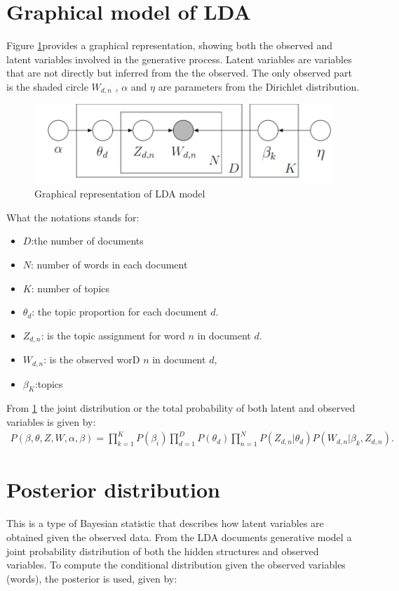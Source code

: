 \section{Graphical model of LDA}
Figure \ref{Figure 2.3}provides a graphical representation, showing both the observed and latent variables involved in the generative process. Latent variables are variables that are not directly but inferred from the the observed.
The only observed part is the shaded circle $W_{d,n}$ , $\alpha$ and $\eta$ are parameters from the Dirichlet distribution.
\begin{figure}[hbtp]
\centering
\includegraphics[scale=0.5]{Graphical.png}
\caption{Graphical representation of LDA model} \label{Figure 2.3}
\end{figure}
What the notations stands for:
\begin{itemize}
\item$D$:the number of documents
\item$N$: number of words in each document
\item$K$: number of topics
\item$\theta_d$: the topic proportion for each document $d$.
\item $Z_{d,n}$: is the topic assignment for word $n$ in document $d$.
\item $W_{d,n}$: is the observed worD $n$ in document $d$,
\item $\beta_K$:topics
\end{itemize}
From \ref{Figure 2.3} the joint  distribution or the total probability of both latent and observed variables is given by:
\begin{align}
P(\beta,\theta,Z,W, \alpha, \beta )=\prod_{k=1}^{K}P(\beta_i)\prod_{d=1}^{D}P(\theta_d)
\prod_{n=1}^{N}P(Z_{d,n}|\theta_d)P(W_{d,n}|\beta_k,Z_{d,n}).
\end{align}
\section{Posterior distribution}
This is a type of Bayesian statistic that describes how  latent variables are obtained given the observed data. From the LDA documents generative model a joint probability distribution of both the hidden structures and observed variables. To compute the conditional distribution given the observed variables (words), the posterior is used, given by:

